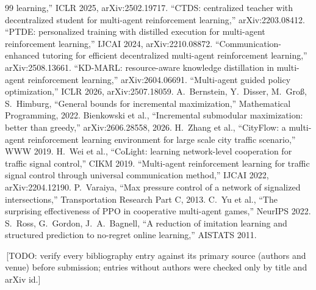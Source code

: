 \documentclass[11pt]{article}
\theoremstyle{definition}
\newif\ifshownotes\shownotestrue
\newcommand{\TODO}[1]{\ifshownotes{\color{todocol}\,\textsf{\footnotesize[TODO: #1]}}\fi}
\begin{document}
\begin{thebibliography}{99}
learning,'' ICLR 2025, arXiv:2502.19717.
 ``CTDS: centralized teacher with decentralized student for multi-agent reinforcement learning,''
arXiv:2203.08412.
 ``PTDE: personalized training with distilled execution for multi-agent reinforcement learning,'' IJCAI
2024, arXiv:2210.08872.
 ``Communication-enhanced tutoring for efficient decentralized multi-agent reinforcement learning,''
arXiv:2508.13661.
 ``KD-MARL: resource-aware knowledge distillation in multi-agent reinforcement learning,''
arXiv:2604.06691.
 ``Multi-agent guided policy optimization,'' ICLR 2026, arXiv:2507.18059.
 A.~Bernstein, Y.~Disser, M.~Gro{\ss}, S.~Himburg, ``General bounds for incremental
maximization,'' Mathematical Programming, 2022.
 Bienkowski et al., ``Incremental submodular maximization: better than greedy,''
arXiv:2606.28558, 2026.
 H.~Zhang et al., ``CityFlow: a multi-agent reinforcement learning environment for large scale city
traffic scenario,'' WWW 2019.
 H.~Wei et al., ``CoLight: learning network-level cooperation for traffic signal control,'' CIKM 2019.
 ``Multi-agent reinforcement learning for traffic signal control through universal communication
method,'' IJCAI 2022, arXiv:2204.12190.
 P.~Varaiya, ``Max pressure control of a network of signalized intersections,'' Transportation
Research Part C, 2013.
 C.~Yu et al., ``The surprising effectiveness of PPO in cooperative multi-agent games,'' NeurIPS 2022.
 S.~Ross, G.~Gordon, J.~A.~Bagnell, ``A reduction of imitation learning and structured prediction to
no-regret online learning,'' AISTATS 2011.
\end{thebibliography}
\TODO{verify every bibliography entry against its primary source (authors and venue) before submission; entries without
authors were checked only by title and arXiv id.}
\end{document}
